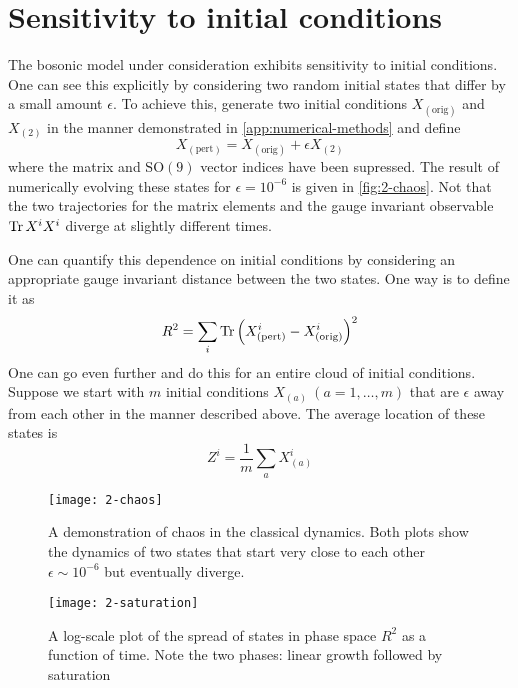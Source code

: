 \section{Sensitivity to initial conditions}
The bosonic model under consideration exhibits sensitivity to initial conditions. One can see this explicitly by considering two random initial states that differ by a small amount $\epsilon$. To achieve this, generate two initial conditions $X_{(\text{orig})}$ and $X_{(2)}$ in the manner demonstrated in \cref{app:numerical-methods} and define
\begin{equation}
    X_{(\text{pert})} = X_{(\text{orig})} + \epsilon X_{(2)}
\end{equation}
where the matrix and $\mathrm{SO}(9)$ vector indices have been supressed. The result of numerically evolving these states for $\epsilon = 10^{-6}$ is given in \cref{fig:2-chaos}. Not that the two trajectories for the matrix elements and the gauge invariant observable $\Tr X^i X^i$ diverge at slightly different times.

One can quantify this dependence on initial conditions by considering an appropriate gauge invariant distance between the two states. One way is to define it as
\begin{equation}
    \label{eqn:dist-two-states}
    R^2 = \sum_{i} \Tr \left( X^i_{(\text{pert})} - X^i_{(\text{orig})} \right)^2
\end{equation}
One can go even further and do this for an entire cloud of initial conditions. Suppose we start with $m$ initial conditions $X_{(a)} \ (a = 1,\ldots,m)$ that are $\epsilon$ away from each other in the manner described above. The average location of these states is
\begin{equation}
    Z^i = \frac{1}{m} \sum_{a} X^{i}_{(a)}
\end{equation}

\begin{figure}[H]
    \centering
    \texttt{[image: 2-chaos]}
    \caption{A demonstration of chaos in the classical dynamics. Both plots show the dynamics of two states that start very close to each other $\epsilon \sim 10^{-6}$ but eventually diverge.}
    \label{fig:2-chaos}

    \texttt{[image: 2-saturation]}
    \caption{A log-scale plot of the spread of states in phase space $R^2$ as a function of time. Note the two phases: linear growth followed by saturation}
    \label{fig:2-saturation}
\end{figure}

